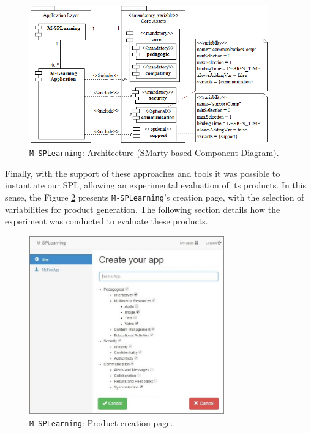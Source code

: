 \begin{figure}[!htbp]
\centering
\includegraphics[width=0.92\textwidth]{MSPLArchitecture.png}
\centering
\caption{\texttt{M-SPLear\allowbreak ning}: Architecture (SMarty-based Component Diagram).}
\label{fig:msplearning-architecture}
\end{figure}

Finally, with the support of these approaches and tools it was possible to instantiate our SPL, allowing an experimental evaluation of its products. In this sense, the Figure \ref{fig:msplearning-web} presents \texttt{M-SPLear\allowbreak ning}'s creation page, with the selection of variabilities for product generation. The following section details how the experiment was conducted to evaluate these products.

\begin{figure}[!htbp]
\centering
\includegraphics[width=0.75\textwidth]{MSPLWebGeneration.jpg}
\centering
\caption{\texttt{M-SPLear\allowbreak ning}: Product creation page.}
\label{fig:msplearning-web}
\end{figure}


